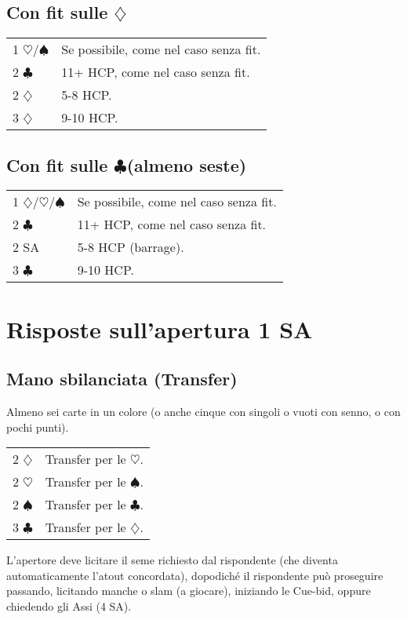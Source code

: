 \documentclass[a4paper,10pt]{article}
\renewcommand{\c}{$\clubsuit$\xspace}
\renewcommand{\d}{$\diamondsuit$\xspace}
\newcommand{\h}{$\heartsuit$\xspace}
\newcommand{\s}{$\spadesuit$\xspace}
\newcommand{\sa}{SA\xspace}
\newcommand{\smallspace}{\vskip0.3cm}
\newenvironment{twocol}
  {\smallspace\noindent\begin{tabular}{l p{0.8\textwidth}}}
  {\end{tabular}\smallspace}
\begin{document}
\subsection{Con fit sulle \d}

\begin{twocol}
 1 \h/\s & Se possibile, come nel caso senza fit.\\
 2 \c  & 11+ HCP, come nel caso senza fit.\\
 2 \d  & 5-8 HCP.\\
 3 \d  & 9-10 HCP.\\
\end{twocol}

\subsection{Con fit sulle \c (almeno seste)}

\begin{twocol}
 1 \d/\h/\s & Se possibile, come nel caso senza fit.\\
 2 \c & 11+ HCP, come nel caso senza fit.\\
 2 \sa & 5-8 HCP (barrage).\\
 3 \c & 9-10 HCP.\\
\end{twocol}



\pagebreak

\section{Risposte sull'apertura 1 SA}

\subsection{Mano sbilanciata (Transfer)}

Almeno sei carte in un colore (o anche cinque con singoli o vuoti con senno, o con pochi punti).

\begin{twocol}
 2 \d & Transfer per le \h.\\
 2 \h & Transfer per le \s.\\
 2 \s & Transfer per le \c.\\
 3 \c & Transfer per le \d.\\
\end{twocol}

L'apertore deve licitare il seme richiesto dal rispondente (che diventa automaticamente l'atout concordata), dopodiché il rispondente può proseguire passando, licitando manche o slam (a giocare), iniziando le Cue-bid, oppure chiedendo gli Assi (4 \sa).
\end{document}
